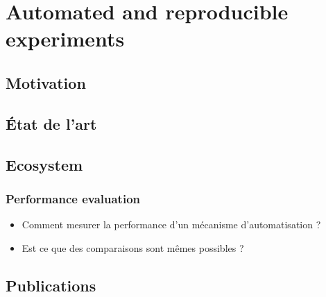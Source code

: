 \chapter{Automated and reproducible experiments} %
\label{cha:automated_and_reproducible_experiments}

\minitoc

\section{Motivation} %
\label{sec:automation_motivation}

\cite{leone2013makesense}
\lipsum


\section{État de l'art} %
\label{sec:_tat_de_l_art}

\lipsum


\section{Ecosystem} %
\label{sec:automation_ecosystem}

\lipsum

\subsection{Performance evaluation} %
\label{sub:performance_evaluation}

\begin{itemize}
	\item Comment mesurer la performance d'un mécanisme d'automatisation ?
	\item Est ce que des comparaisons sont mêmes possibles ?
\end{itemize}



\section{Publications} %
\label{sec:automated_publications}


